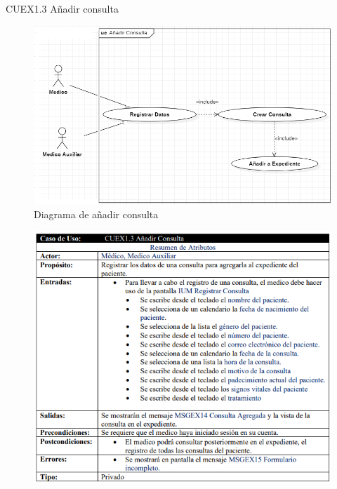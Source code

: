 \documentclass[12pt,letterpaper]{article}
\begin{document}
            \newpage
            CUEX1.3 Añadir consulta
            \begin{figure}[H]
                \centering
                \includegraphics [scale=0.4]{casosUso/agregarConsulta}
                \caption{Diagrama de añadir consulta}
            \end{figure}
            \begin{figure}[H]
                \centering
                \includegraphics [scale=0.8]{specs/specAgregarConsulta}
            \end{figure}
\end{document}
